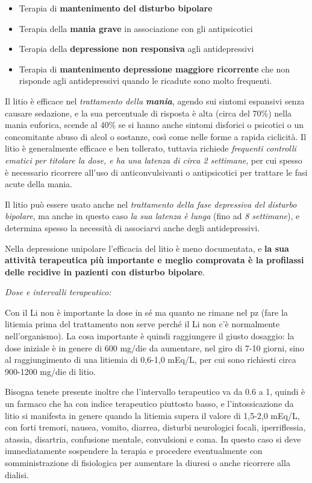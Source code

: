 \begin{itemize}
\begin{itemize}
\item
  Terapia di \textbf{mantenimento del disturbo bipolare}
\item
  Terapia della \textbf{mania grave} in associazione con gli
  antipsicotici
\item
  Terapia della \textbf{depressione non responsiva} agli antidepressivi
\item
  Terapia di \textbf{mantenimento depressione maggiore ricorrente} che
  non risponde agli antidepressivi quando le ricadute sono molto
  frequenti.
\end{itemize}

Il litio è efficace nel \emph{trattamento della \textbf{mania}}, agendo
sui sintomi espansivi senza causare sedazione, e la sua percentuale di
risposta è alta (circa del 70\%) nella mania euforica, scende al 40\% se
si hanno anche sintomi disforici o psicotici o un concomitante abuso di
alcol o sostanze, così come nelle forme a rapida ciclicità. Il litio è
generalmente efficace e ben tollerato, tuttavia richiede \emph{frequenti
controlli ematici per titolare la dose, e ha una latenza di circa 2
settimane}, per cui spesso è necessario ricorrere all'uso di
anticonvulsivanti o antipsicotici per trattare le fasi acute della
mania.

Il litio può essere usato anche nel \emph{trattamento della fase
depressiva del disturbo bipolare}, ma anche in questo caso \emph{la sua
latenza è lunga} (fino ad \emph{8 settimane}), e determina spesso la
necessità di associarvi anche degli antidepressivi.

Nella depressione unipolare l'efficacia del litio è meno documentata, e
\textbf{la sua attività terapeutica più importante e meglio comprovata è
la profilassi delle recidive in pazienti con disturbo bipolare}.

\emph{\emph{Dose e intervalli terapeutico:}}

Con il Li non è importante la dose in sé ma quanto ne rimane nel pz
(fare la litiemia prima del trattamento non serve perché il Li non c'è
normalmente nell'organismo). La cosa importante è quindi raggiungere il
giusto dosaggio: la dose iniziale è in genere di 600 mg/die da
aumentare, nel giro di 7-10 giorni, sino al raggiungimento di una
litiemia di 0,6-1,0 mEq/L, per cui sono richiesti circa 900-1200 mg/die
di litio.

Bisogna tenete presente inoltre che l'intervallo terapeutico va da 0.6 a
1, quindi è un farmaco che ha con indice terapeutico piuttosto basso, e
l'intossicazione da litio si manifesta in genere quando la litiemia
supera il valore di 1,5-2,0 mEq/L, con forti tremori, nausea, vomito,
diarrea, disturbi neurologici focali, iperriflessia, atassia, disartria,
confusione mentale, convulsioni e coma. In questo caso si deve
immediatamente sospendere la terapia e procedere eventualmente con
somministrazione di fisiologica per aumentare la diuresi o anche
ricorrere alla dialisi.


\end{itemize}
